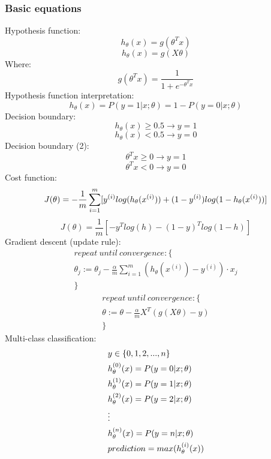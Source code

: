 \documentclass[12pt]{article}
\begin{document}
\subsubsection{Basic equations}
Hypothesis function:
\begin{equation}
h_{\theta}(x)=g(\theta^{T}x)
\end{equation}
\begin{equation}
h_{\theta}(x)=g(X\theta)
\end{equation}
Where:
\begin{equation}
g(\theta^{T}x)=\frac{1}{1+e^{-\theta^{T}x}}
\end{equation}
Hypothesis function interpretation:
\begin{equation}
h_{\theta}(x)=P(y=1|x;\theta)=1-P(y=0|x;\theta)
\end{equation}
Decision boundary:
\begin{equation}
h_{\theta}(x)\geq 0.5 \rightarrow y=1
\end{equation}
\begin{equation}
h_{\theta}(x)< 0.5 \rightarrow y=0
\end{equation}
Decision boundary (2):
\begin{equation}
\theta^{T}x\geq 0 \rightarrow y=1
\end{equation}
\begin{equation}
\theta^{T}x<0 \rightarrow y=0
\end{equation}
Cost function:
\begin{equation}
J(\theta)=-\frac{1}{m}\sum_{i=1}^{m}[y^{(i)}log(h_{\theta}(x^{(i)}))+(1-y^{(i)})log(1-h_{\theta}(x^{(i)}))]\\
\end{equation}
\begin{equation}
J(\theta)=\frac{1}{m}[-y^{T}log(h)-(1-y)^{T}log(1-h)]
\end{equation}
Gradient descent (update rule):
\begin{multline}
repeat\:until\:convergence: \{\\
\theta_j:=\theta_{j}-\frac{\alpha}{m}\sum_{i=1}^{m}(h_{\theta}(x^{(i)})-y^{(i)})\cdot x_j\\
\}
\end{multline}
\begin{multline}
repeat\:until\:convergence: \{\\
\theta:=\theta-\frac{\alpha}{m}X^{T}(g(X\theta)-y)\\
\}
\end{multline}
Multi-class classification:
\begin{equation}
\begin{aligned}
&y \in \{0,1,2,...,n\}\notag\\
&h_{\theta}^{(0)}(x)=P(y=0|x;\theta)\\
&h_{\theta}^{(1)}(x)=P(y=1|x;\theta)\\
&h_{\theta}^{(2)}(x)=P(y=2|x;\theta)\\
&\vdots\\
&h_{\theta}^{(n)}(x)=P(y=n|x;\theta)\\
&prediction = max(h_{\theta}^{(i)}(x))
\end{aligned}
\end{equation}
\end{document}
